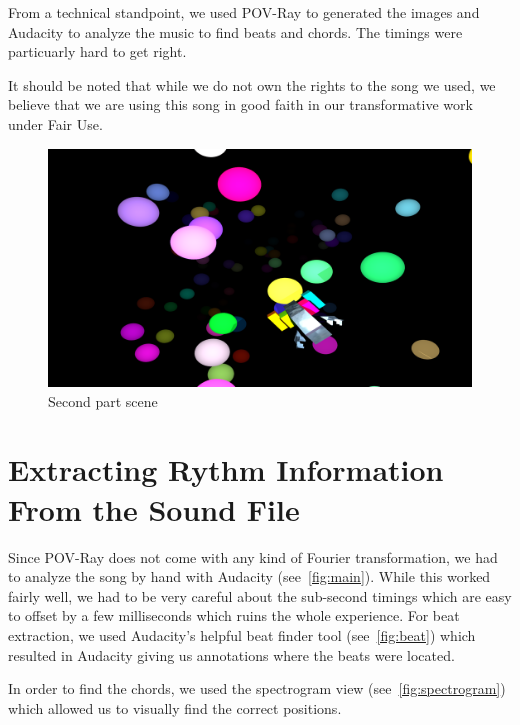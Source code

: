 \documentclass[a4paper, 12pt]{scrartcl}
\begin{document}
    From a technical standpoint, we used POV-Ray to generated the images and Audacity to analyze
    the music to find beats and chords. The timings were particuarly hard to get right.

    It should be noted that while we do not own the rights to the song we used, we believe that we
    are using this song in good faith in our transformative work under Fair Use.

    \begin{figure}[H]
        \centering
        \includegraphics[scale=0.23]{render_part2}
        \caption{Second part scene}
        \label{fig:part2}
    \end{figure}

    \section{Extracting Rythm Information From the Sound File}

    Since POV-Ray does not come with any kind of Fourier transformation, we had to analyze the song
    by hand with Audacity (see~\ref{fig:main}). While this worked fairly well, we had to be very
    careful about the sub-second timings which are easy to offset by a few milliseconds which ruins
    the whole experience. For beat extraction, we used Audacity's helpful beat finder tool
    (see~\ref{fig:beat}) which resulted in Audacity giving us annotations where the beats were
    located.

    In order to find the chords, we used the spectrogram view (see~\ref{fig:spectrogram}) which
    allowed us to visually find the correct positions.
\end{document}
